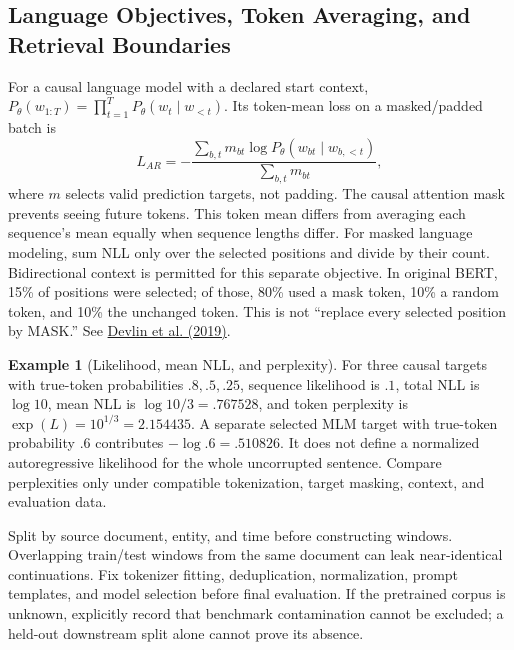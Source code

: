 \documentclass[11pt,twoside]{article}
\numberwithin{equation}{section}
\theoremstyle{plain}
\theoremstyle{definition}
\newtheorem{example}[theorem]{Example}
\theoremstyle{remark}
\begin{document}
\subsection{Language Objectives, Token Averaging, and Retrieval Boundaries}
\label{sec:language-objectives}
For a causal language model with a declared start context,
$P_\theta(w_{1:T})=\prod_{t=1}^T P_\theta(w_t\mid w_{<t})$.
Its token-mean loss on a masked/padded batch is
\[
L_{AR}=-\frac{\sum_{b,t}m_{bt}\log P_\theta(w_{bt}\mid w_{b,<t})}
 {\sum_{b,t}m_{bt}},
\]
where $m$ selects valid prediction targets, not padding. The causal attention
mask prevents seeing future tokens. This token mean differs from averaging
each sequence's mean equally when sequence lengths differ.
For masked language modeling, sum NLL only over the selected positions and
divide by their count. Bidirectional context is permitted for this separate
objective. In original BERT, 15\% of positions were selected; of those,
80\% used a mask token, 10\% a random token, and 10\% the unchanged token.
This is not ``replace every selected position by MASK.'' See
\href{https://aclanthology.org/N19-1423/}{Devlin et al. (2019)}.

\begin{example}[Likelihood, mean NLL, and perplexity]
For three causal targets with true-token probabilities $.8,.5,.25$, sequence
likelihood is $.1$, total NLL is $\log10$, mean NLL is $\log10/3=.767528$,
and token perplexity is $\exp(L)=10^{1/3}=2.154435$.
A separate selected MLM target with true-token probability $.6$ contributes
$-\log.6=.510826$. It does not define a normalized autoregressive likelihood
for the whole uncorrupted sentence. Compare perplexities only under compatible
tokenization, target masking, context, and evaluation data.

Split by source document, entity, and time before constructing windows.
Overlapping train/test windows from the same document can leak near-identical
continuations. Fix tokenizer fitting, deduplication, normalization, prompt
templates, and model selection before final evaluation. If the pretrained
corpus is unknown, explicitly record that benchmark contamination cannot be
excluded; a held-out downstream split alone cannot prove its absence.
\end{example}
\end{document}
